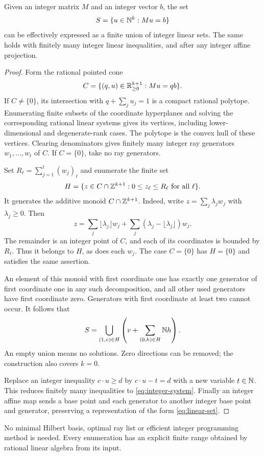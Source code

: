 \begin{lemma}
\label{lem:cone}
Given an integer matrix $M$ and an integer vector $b$, the set
\begin{equation}
 S=\{u\in\mathbb N^k:Mu=b\}
 \label{eq:integer-system}
\end{equation}
can be effectively expressed as a finite union of integer linear
sets. The same holds with finitely many integer linear inequalities,
and after any integer affine projection.
\end{lemma}
\begin{proof}
Form the rational pointed cone
\[
 C=\{(q,u)\in\mathbb R_{\ge0}^{k+1}:Mu=qb\}.
\]
If $C\ne\{0\}$, its intersection with $q+\sum_j u_j=1$ is a
compact rational polytope. Enumerating finite subsets of the coordinate
hyperplanes and solving the corresponding rational linear systems
gives its vertices, including lower-dimensional and degenerate-rank
cases. The polytope is the convex hull of these vertices. Clearing
denominators gives finitely many integer ray generators
$w_1,\ldots,w_t$ of $C$. If $C=\{0\}$, take no ray generators.

Set $R_\ell=\sum_{j=1}^t(w_j)_\ell$ and enumerate the finite set
\[
 H=\{z\in C\cap\mathbb Z^{k+1}:0\le z_\ell\le R_\ell
                          \text{ for all }\ell\}.
\]
It generates the additive monoid $C\cap\mathbb Z^{k+1}$. Indeed, write
$z=\sum_j\lambda_jw_j$ with $\lambda_j\ge0$. Then
\[
 z=\sum_j\lfloor\lambda_j\rfloor w_j+
       \sum_j(\lambda_j-\lfloor\lambda_j\rfloor)w_j.
\]
The remainder is an integer point of $C$, and each of its coordinates
is bounded by $R_\ell$. Thus it belongs to $H$, as does each $w_j$.
The case $C=\{0\}$ has $H=\{0\}$ and satisfies the same assertion.

An element of this monoid with first coordinate one has exactly one
generator of first coordinate one in any such decomposition, and
all other used generators have first coordinate zero. Generators
with first coordinate at least two cannot occur. It follows that
\begin{equation}
 S=\bigcup_{(1,v)\in H}
       \left(v+\sum_{(0,h)\in H}\mathbb N h\right).
 \label{eq:cone-output}
\end{equation}
An empty union means no solutions. Zero directions can be removed;
the construction also covers $k=0$.

Replace an integer inequality $c\cdot u\ge d$ by
$c\cdot u-t=d$ with a new variable $t\in\mathbb N$. This reduces finitely
many inequalities to \eqref{eq:integer-system}. Finally an integer
affine map sends a base point and each generator to another integer
base point and generator, preserving a representation of the form
\eqref{eq:linear-set}.
\end{proof}

No minimal Hilbert basis, optimal ray list or efficient integer
programming method is needed. Every enumeration has an explicit
finite range obtained by rational linear algebra from its input.
